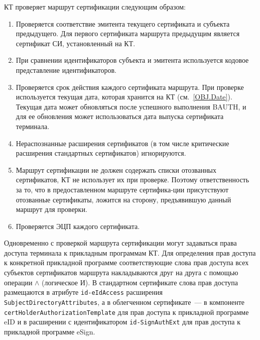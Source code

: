 
КТ проверяет маршрут сертификации следующим образом:

\begin{enumerate}
\item
Проверяется соответствие эмитента текущего сертификата и субъекта 
предыдущего. Для первого сертификата маршрута предыдущим является 
сертификат СИ, установленный на КТ. 

\item
При сравнении идентификаторов субъекта и эмитента используется кодовое 
представление идентификаторов. 

\item
Проверяется срок действия каждого сертификата маршрута. При проверке 
используется текущая дата, которая хранится на КТ (см.~\ref{OBJ.Date}). 
Текущая дата может обновляться после успешного выполнения BAUTH, и для ее 
обновления может использоваться дата выпуска сертификата терминала. 

\item
Нераспознанные расширения сертификатов (в том числе критические 
расширения стандартных сертификатов) игнорируются. 

\item
Маршрут сертификации не должен содержать списки отозванных сертификатов, 
КТ не использует их при проверке. Поэтому ответственность за то, что в 
предоставленном маршруте сертифика-ции присутствуют отозванные 
сертификаты, ложится на сторону, предъявившую данный маршрут для проверки. 

\item
Проверяется ЭЦП каждого сертификата.
\end{enumerate}

Одновременно с проверкой маршрута сертификации могут задаваться права 
доступа терминала к прикладным программам КТ.
Для определения прав доступа к конкретной 
прикладной программе соответствующие слова прав доступа 
всех субъектов сертификатов маршрута накладываются друг на 
друга с помощью операции $\wedge$ (логическое И). 
В стандартном сертификате слова прав доступа размещаются в 
атрибуте \verb|id-eIdAccess| расширения \verb|SubjectDirectoryAttributes|, 
а в облегченном сертификате~--- в компоненте 
\verb|certHolderAuthorizationTemplate| для прав доступа к прикладной
программе eID и в расширении с идентификатором
\verb|id-SignAuthExt| для прав доступа к прикладной
программе eSign.


